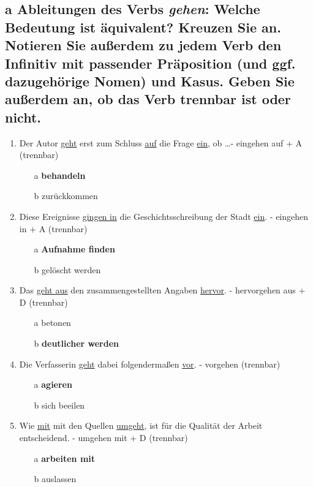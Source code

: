 \documentclass{article}
\begin{document}
	\subsection*{\textbf{a} Ableitungen des Verbs \textit{gehen}: Welche Bedeutung ist äquivalent? Kreuzen Sie an. Notieren Sie außerdem zu jedem Verb den Infinitiv mit passender Präposition (und ggf. dazugehörige Nomen) und Kasus. Geben Sie außerdem an, ob das Verb trennbar ist oder nicht.}
	\begin{enumerate}
		\item{Der Autor \underline{geht} erst zum Schluss \underline{auf} die Frage \underline{ein}, ob \dots - eingehen auf + A (trennbar)}
		\begin{itemize}
			\item[a]{\textbf{behandeln}}
			\item[b]{zurückkommen}
		\end{itemize}
				\item{Diese Ereignisse \underline{gingen in} die Geschichtsschreibung der Stadt \underline{ein}. - eingehen in + A (trennbar)}
		\begin{itemize}
			\item[a]{\textbf{Aufnahme finden}}
			\item[b]{gelöscht werden}
		\end{itemize}
				\item{Das \underline{geht aus} den zusammengestellten Angaben \underline{hervor}. - hervorgehen aus + D (trennbar)}
		\begin{itemize}
			\item[a]{betonen}
			\item[b]{\textbf{deutlicher werden}}
		\end{itemize}
				\item{Die Verfasserin \underline{geht} dabei folgendermaßen \underline{vor}. - vorgehen (trennbar)}
		\begin{itemize}
			\item[a]{\textbf{agieren}}
			\item[b]{sich beeilen}
		\end{itemize}
				\item{Wie \underline{mit} mit den Quellen \underline{umgeht}, ist für die Qualität der Arbeit entscheidend. - umgehen mit + D (trennbar)}
		\begin{itemize}
			\item[a]{\textbf{arbeiten mit}}
			\item[b]{auslassen}
		\end{itemize}

\end{enumerate}
\end{document}
